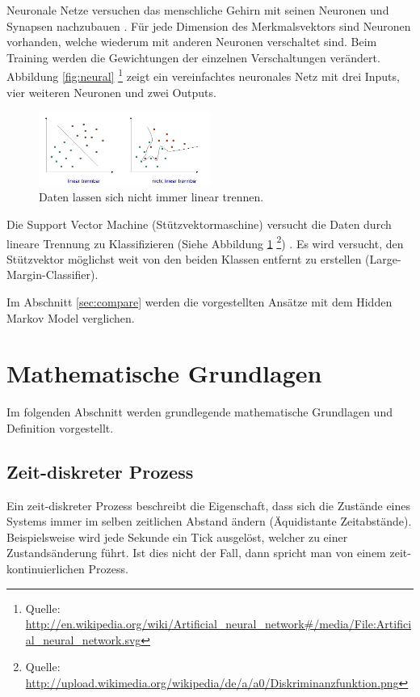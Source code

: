 Neuronale Netze versuchen das menschliche Gehirn mit seinen Neuronen und Synapsen nachzubauen \cite{neuron}. Für jede Dimension des Merkmalsvektors sind Neuronen vorhanden, welche wiederum mit anderen Neuronen verschaltet sind. Beim Training werden die Gewichtungen der einzelnen Verschaltungen verändert.
Abbildung \ref{fig:neural} \footnote{Quelle: \url{http://en.wikipedia.org/wiki/Artificial_neural_network\#/media/File:Artificial_neural_network.svg}} zeigt ein vereinfachtes neuronales Netz mit drei Inputs, vier weiteren Neuronen und zwei Outputs.

\begin{figure}[htbp] \centering
    \includegraphics[width=0.5\textwidth]{Bilder/Kap1/svm}
    \caption{ Daten lassen sich nicht immer linear trennen.}
    \label{fig:svm}
\end{figure}

Die Support Vector Machine (Stützvektormaschine) versucht die Daten durch lineare Trennung zu Klassifizieren (Siehe Abbildung \ref{fig:svm} \footnote{Quelle: \url{http://upload.wikimedia.org/wikipedia/de/a/a0/Diskriminanzfunktion.png}})
\cite{svm}. Es wird versucht, den Stützvektor möglichst weit von den beiden Klassen entfernt zu erstellen (Large-Margin-Classifier).


Im Abschnitt \ref{sec:compare} werden die vorgestellten Ansätze mit dem Hidden Markov Model verglichen.



\section{Mathematische Grundlagen}
Im folgenden Abschnitt werden grundlegende mathematische Grundlagen und Definition vorgestellt.

\subsection{Zeit-diskreter Prozess}
\label{sec:timedisc}
Ein zeit-diskreter Prozess beschreibt die Eigenschaft, dass sich die Zustände eines Systems immer im selben zeitlichen Abstand ändern (Äquidistante Zeitabstände). Beispielsweise wird jede Sekunde ein Tick ausgelöst, welcher zu einer Zustandsänderung führt. 
Ist dies nicht der Fall, dann spricht man von einem zeit-kontinuierlichen Prozess.

